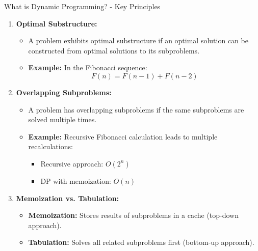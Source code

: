 \documentclass[aspectratio=169]{beamer}
\begin{document}
\begin{frame}[fragile]{What is Dynamic Programming? - Key Principles}
    \begin{enumerate}
        \item \textbf{Optimal Substructure:}
        \begin{itemize}
            \item A problem exhibits optimal substructure if an optimal solution can be constructed from optimal solutions to its subproblems. 
            \item \textbf{Example:} In the Fibonacci sequence:
            \begin{equation}
                F(n) = F(n-1) + F(n-2)
            \end{equation}
        \end{itemize}

        \item \textbf{Overlapping Subproblems:}
        \begin{itemize}
            \item A problem has overlapping subproblems if the same subproblems are solved multiple times.
            \item \textbf{Example:} Recursive Fibonacci calculation leads to multiple recalculations:
            \begin{itemize}
                \item Recursive approach: \(O(2^n)\)
                \item DP with memoization: \(O(n)\)
            \end{itemize}
        \end{itemize}

        \item \textbf{Memoization vs. Tabulation:}
        \begin{itemize}
            \item \textbf{Memoization:} Stores results of subproblems in a cache (top-down approach).
            \item \textbf{Tabulation:} Solves all related subproblems first (bottom-up approach).
        \end{itemize}
    \end{enumerate}
\end{frame}
\end{document}
